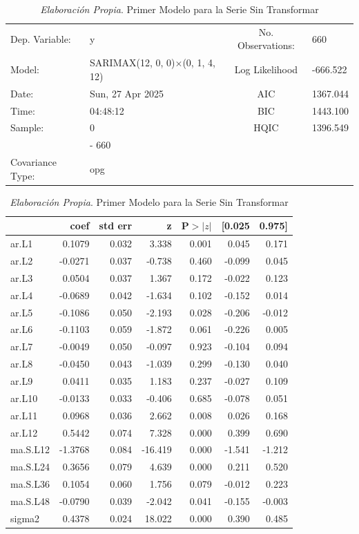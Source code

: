 \documentclass[12pt,letterpaper]{article}   %
\begin{document}
\begin{table}[htbp]
\centering
\tiny
\caption{\textit{Elaboración Propia}. Primer Modelo para la Serie Sin Transformar}
\begin{tabular}{llcl}
\toprule
Dep. Variable: & y & No. Observations: & 660 \\
Model: & SARIMAX(12, 0, 0)$\times$(0, 1, 4, 12) & Log Likelihood & -666.522 \\
Date: & Sun, 27 Apr 2025 & AIC & 1367.044 \\
Time: & 04:48:12 & BIC & 1443.100 \\
Sample: & 0 & HQIC & 1396.549 \\
        & - 660 & & \\
Covariance Type: & opg & & \\
\bottomrule
\end{tabular}

\vspace{0.3cm}

\begin{tabular}{lrrrrrr}
\toprule
 & \textbf{coef} & \textbf{std err} & \textbf{z} & \textbf{P$>|z|$} & \textbf{[0.025} & \textbf{0.975]} \\
\midrule
ar.L1     & 0.1079 & 0.032 & 3.338  & 0.001 & 0.045 & 0.171 \\
ar.L2     & -0.0271 & 0.037 & -0.738 & 0.460 & -0.099 & 0.045 \\
ar.L3     & 0.0504 & 0.037 & 1.367  & 0.172 & -0.022 & 0.123 \\
ar.L4     & -0.0689 & 0.042 & -1.634 & 0.102 & -0.152 & 0.014 \\
ar.L5     & -0.1086 & 0.050 & -2.193 & 0.028 & -0.206 & -0.012 \\
ar.L6     & -0.1103 & 0.059 & -1.872 & 0.061 & -0.226 & 0.005 \\
ar.L7     & -0.0049 & 0.050 & -0.097 & 0.923 & -0.104 & 0.094 \\
ar.L8     & -0.0450 & 0.043 & -1.039 & 0.299 & -0.130 & 0.040 \\
ar.L9     & 0.0411 & 0.035 & 1.183  & 0.237 & -0.027 & 0.109 \\
ar.L10    & -0.0133 & 0.033 & -0.406 & 0.685 & -0.078 & 0.051 \\
ar.L11    & 0.0968 & 0.036 & 2.662  & 0.008 & 0.026 & 0.168 \\
ar.L12    & 0.5442 & 0.074 & 7.328  & 0.000 & 0.399 & 0.690 \\
ma.S.L12  & -1.3768 & 0.084 & -16.419 & 0.000 & -1.541 & -1.212 \\
ma.S.L24  & 0.3656 & 0.079 & 4.639  & 0.000 & 0.211 & 0.520 \\
ma.S.L36  & 0.1054 & 0.060 & 1.756  & 0.079 & -0.012 & 0.223 \\
ma.S.L48  & -0.0790 & 0.039 & -2.042 & 0.041 & -0.155 & -0.003 \\
sigma2    & 0.4378 & 0.024 & 18.022 & 0.000 & 0.390 & 0.485 \\
\bottomrule
\end{tabular}


\end{table}
\end{document}

